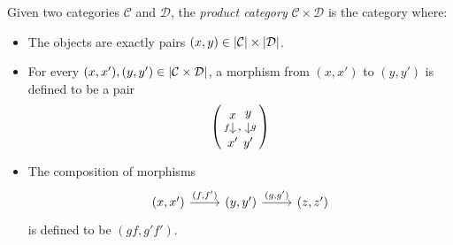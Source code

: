 \begin{construction}
  Given two categories \(\mathcal{C}\) and \(\mathcal{D}\), the {\em product
    category} \(\mathcal{C} \times \mathcal{D}\) is the category where:
  \begin{itemize}[leftmargin=*]
  \item The objects are exactly pairs
    \((x, y) \in \left\lvert\mathcal{C}\right\rvert \times \left\lvert\mathcal{D}\right\rvert\).
  \item For every \((x, x'), (y, y') \in \left\lvert\mathcal{C} \times \mathcal{D}\right\rvert\), a
    morphism from \((x, x')\) to \((y, y')\) is defined to be a pair
    \[
      \left(
        \begin{tikzcd}[row sep=small, cramped] x \ar["{f}", d, swap] \\
          x' \end{tikzcd} ,
        \begin{tikzcd}[row sep=small, cramped] y \ar["{g}", d] \\
          y' \end{tikzcd} \right)
    \]
  \item The composition of morphisms
    \[
      \begin{tikzcd}
        (x, x') \ar["{(f, f')}", r] & (y, y') \ar["{(g, g')}", r] & (z,
        z')
      \end{tikzcd}
    \]
    is defined to be \((gf, g'f')\).
  \end{itemize}
\end{construction}

\begin{example}
\end{example}


